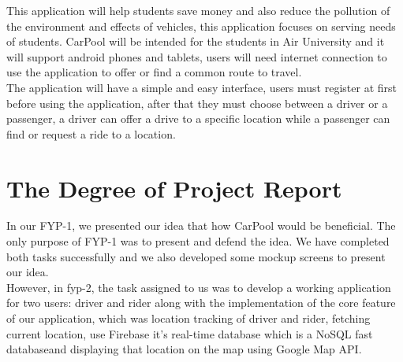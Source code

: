 This application will help students save money and also reduce the pollution of the environment and effects of vehicles, this application focuses on serving needs of students. CarPool will be intended for the students in Air University and it will support android phones and tablets, users will need internet connection to use the application to offer or find a common route to travel.\\

The application will have a simple and easy interface, users must register at first before using the application, after that they must choose between a driver or a passenger, a driver can offer a drive to a specific location while a passenger can find or request a ride to a location.

\section{The Degree of Project Report}
In our FYP-1, we presented our idea that how CarPool would be beneficial. The only purpose of FYP-1 was to present and defend the idea. We have completed both tasks successfully and we also developed some mockup screens to present our idea.\\

However, in fyp-2, the task assigned to us was to develop a working application for two users: driver and rider along with the implementation of the core feature of our application, which was location tracking of driver and rider, fetching current location, use Firebase it’s real-time database which is a NoSQL fast databaseand displaying that location on the map using Google Map API.
